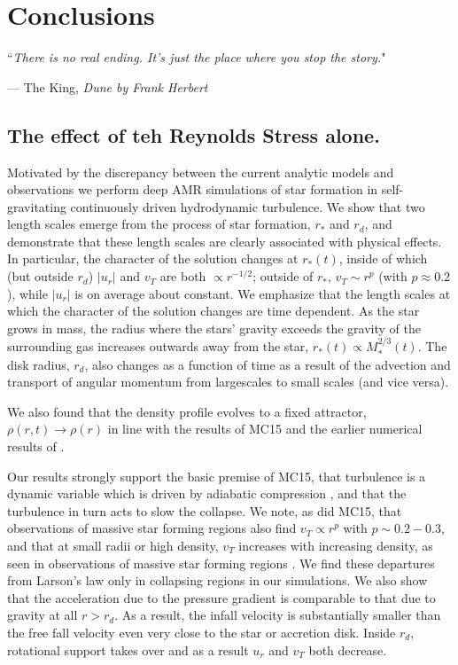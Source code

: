 \documentclass[../dissertation.tex]{subfiles}
\begin{document}
\chapter{Conclusions}
\label{ch:conclusions}

\singlespace
\epigraph{``\emph{There is no real ending. It's just the place where you stop the story.}"}{--- \textup{The King}, \textit{Dune by Frank Herbert}}

\dblspace

\section{The effect of teh Reynolds Stress alone.}

Motivated by the discrepancy between the current analytic models and observations we perform deep AMR simulations 
of star formation in self-gravitating continuously driven hydrodynamic turbulence. 
We show that two length scales emerge from the process of star formation, $r_*$ and $r_d$, and demonstrate
that these length scales are clearly associated with physical effects. 
In particular, the character of the 
solution changes at $r_*(t)$, inside of which (but outside $r_d$) $|u_r|$ and  $v_T$ are both
$\propto r^{-1/2}$; outside of $r_*$, $v_T\sim r^{p}$ (with $p\approx0.2$), while $|u_r|$ 
is on average about constant. 
We emphasize that the length scales at which the character of the solution changes are time dependent. 
As the star grows in mass, the radius where the stars' gravity exceeds the gravity of the surrounding gas increases outwards away from the star, 
$r_*(t) \propto M_*^{2/3}(t)$.
The disk radius, $r_d$, also changes as a function of time as a result of the advection and transport of angular momentum from largescales to small scales (and vice versa).

We also found that the density profile evolves
to a fixed attractor, $\rho(r,t ) \rightarrow \rho(r)$ in line with the results of MC15 and 
the earlier numerical results of \citet{2015ApJ...800...49L}. 

Our results strongly support the basic premise of MC15, that turbulence is a dynamic variable 
which is driven by adiabatic compression \citep{2012ApJ...750L..31R}, and that the turbulence
in turn acts to slow the collapse. 
We note, as did MC15, that observations of massive star forming regions also find $v_T \propto r^p$ 
with $ p \sim 0.2-0.3$, and that at small radii or high density, $v_T$  
increases with increasing density, as seen in observations of massive star forming
regions \citep{1997ApJ...476..730P}. We find these departures from Larson's law only in
collapsing regions in our simulations. We also show that the acceleration 
due to the pressure gradient is comparable to that due to gravity at all $r>r_d$. 
As a result, the infall velocity is substantially smaller than the free fall velocity
even very close to the star or accretion disk. Inside $r_d$, rotational support takes over 
and as a result $u_r$ and $v_T$ both decrease.  
\end{document}
